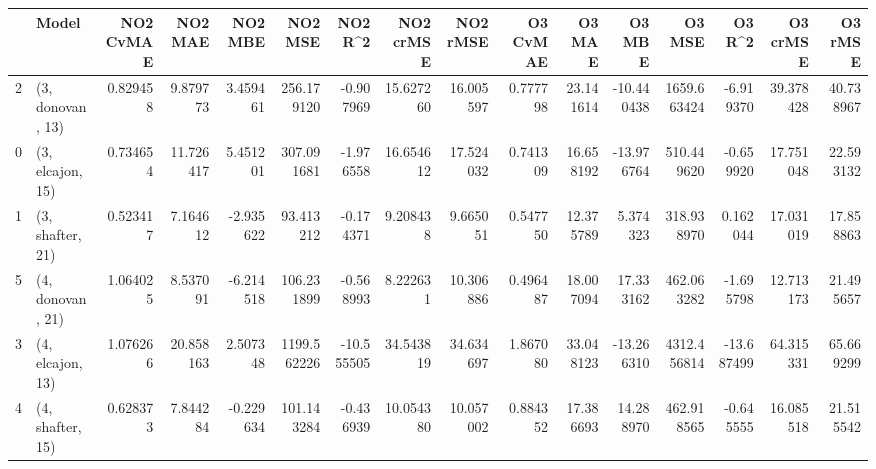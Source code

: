 \begin{tabular}{llrrrrrrrrrrrrrr}
\toprule
{} &             Model &  NO2 CvMAE &    NO2 MAE &   NO2 MBE &      NO2 MSE &    NO2 R\textasciicircum2 &  NO2 crMSE &   NO2 rMSE &  O3 CvMAE &     O3 MAE &     O3 MBE &       O3 MSE &     O3 R\textasciicircum2 &   O3 crMSE &    O3 rMSE \\
\midrule
2 &  (3, donovan, 13) &   0.829458 &   9.879773 &  3.459461 &   256.179120 &  -0.907969 &  15.627260 &  16.005597 &  0.777798 &  23.141614 & -10.440438 &  1659.663424 &  -6.919370 &  39.378428 &  40.738967 \\
0 &  (3, elcajon, 15) &   0.734654 &  11.726417 &  5.451201 &   307.091681 &  -1.976558 &  16.654612 &  17.524032 &  0.741309 &  16.658192 & -13.976764 &   510.449620 &  -0.659920 &  17.751048 &  22.593132 \\
1 &  (3, shafter, 21) &   0.523417 &   7.164612 & -2.935622 &    93.413212 &  -0.174371 &   9.208438 &   9.665051 &  0.547750 &  12.375789 &   5.374323 &   318.938970 &   0.162044 &  17.031019 &  17.858863 \\
5 &  (4, donovan, 21) &   1.064025 &   8.537091 & -6.214518 &   106.231899 &  -0.568993 &   8.222631 &  10.306886 &  0.496487 &  18.007094 &  17.333162 &   462.063282 &  -1.695798 &  12.713173 &  21.495657 \\
3 &  (4, elcajon, 13) &   1.076266 &  20.858163 &  2.507348 &  1199.562226 & -10.555505 &  34.543819 &  34.634697 &  1.867080 &  33.048123 & -13.266310 &  4312.456814 & -13.687499 &  64.315331 &  65.669299 \\
4 &  (4, shafter, 15) &   0.628373 &   7.844284 & -0.229634 &   101.143284 &  -0.436939 &  10.054380 &  10.057002 &  0.884352 &  17.386693 &  14.288970 &   462.918565 &  -0.645555 &  16.085518 &  21.515542 \\
\bottomrule
\end{tabular}

